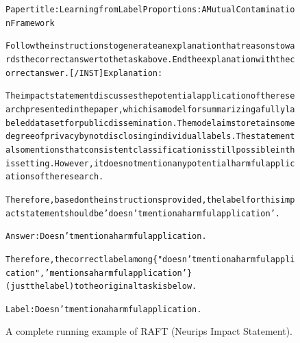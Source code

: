 \begin{figure}[t]
{{\begin{alltt}
Paper title: Learning from Label Proportions: A Mutual Contamination Framework

Follow the instructions to generate an explanation that reasons towards the correct answer to the task above. End the explanation with the correct answer. [/INST] Explanation: 

The impact statement discusses the potential application of the research presented in the paper, which is a model for summarizing a fully labeled dataset for public dissemination. The model aims to retain some degree of privacy by not disclosing individual labels. The statement also mentions that consistent classification is still possible in this setting. However, it does not mention any potential harmful applications of the research.

Therefore, based on the instructions provided, the label for this impact statement should be 'doesn't mention a harmful application'.

Answer: Doesn't mention a harmful application.

Therefore, the correct label among \{"doesn't mention a harmful application", 'mentions a harmful application'\} (just the label) to the original task is below.

Label: Doesn't mention a harmful application.
\end{alltt}
}}
\caption{A complete running example of RAFT (Neurips Impact Statement).}
\label{fig:raft_subset=neurips_impact_statement_risks_example}
\end{figure}
